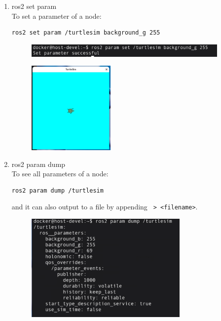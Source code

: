 \documentclass[12pt, a4paper]{article}
\begin{document}
\begin{enumerate}
\newpage
\item ros2 set param\\
To set a parameter of a node:
\begin{lstlisting}[language=bash]
ros2 set param /turtlesim background_g 255
\end{lstlisting}
\begin{figure}[h]
	\setlength{\leftskip}{2.4em}
	\includegraphics[width=0.94\textwidth]{p1.6-3}
\end{figure}
\begin{figure}[h]
	\centering
	\includegraphics[width=0.4\textwidth]{p1.6-4}
\end{figure}

\item ros2 param dump\\
To see all parameters of a node:
\begin{lstlisting}[language=bash]
ros2 param dump /turtlesim
\end{lstlisting}
and it can also output to a file by appending \texttt{ > <filename>}.
\begin{figure}[h]
	\centering
	\includegraphics[width=0.75\textwidth]{p1.6-5}
\end{figure}


\end{enumerate}
\end{document}
